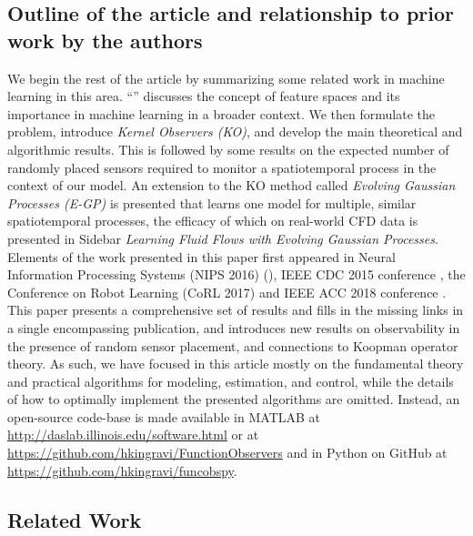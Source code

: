 \documentclass[letterpaper,12pt,peerreviewca,draftcls]{IEEEtran}
\begin{document}
\subsection*{Outline of the article and relationship to prior work by the authors}
 We begin the rest of the article by summarizing some related work in machine learning in this area.  ``'' discusses the concept of feature spaces and its importance in machine learning in a broader context. We then formulate the problem, introduce \emph{Kernel Observers (KO)}, and develop the main theoretical and algorithmic results.
This is followed by some results on the expected number of randomly placed sensors required to monitor a spatiotemporal process in the context of our model. An extension to the KO method called \emph{Evolving Gaussian Processes (E-GP)} is presented that learns one model for multiple, similar spatiotemporal processes, the efficacy of which on real-world CFD data is presented in Sidebar \emph{Learning Fluid Flows with Evolving Gaussian Processes}.
Elements of the work presented in this paper first appeared in Neural Information Processing Systems (NIPS 2016) (\cite{Kingravi16_NIPS,whitman2016NIPSworkshop}), IEEE CDC 2015 conference \cite{Kingravi:2015a}, the Conference on Robot Learning (CoRL 2017) \cite{whitman2017learning} and IEEE ACC 2018 conference \cite{Maske18_ACC}.  This paper presents a comprehensive set of results and fills in the missing links in a single encompassing publication, and introduces new results on observability in the presence of random sensor placement, and connections to Koopman operator theory. As such, we have focused in this article mostly on the fundamental theory and practical algorithms for modeling, estimation, and control, while the details of how to optimally implement the presented algorithms are omitted. Instead, an open-source code-base is made available in MATLAB at \url{http://daslab.illinois.edu/software.html} or at \url{https://github.com/hkingravi/FunctionObservers} and in Python on GitHub at \url{https://github.com/hkingravi/funcobspy}.









%

\subsection{Related Work}\label{sec:related}
\end{document}

